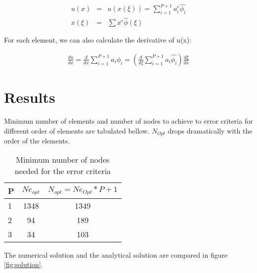 \documentclass[paper=a4, fontsize=11pt]{article} %
\begin{document}
\begin{eqnarray}
 u(x) &=& u(x(\xi))=\sum_{i=1}^{P+1} a_i^e \hat{\phi_i}\nonumber\\
 x(\xi) &=& \sum x^e \hat{\phi}(\xi)
 \end{eqnarray} 

For each element, we can also calculate the derivative of u(x):

\begin{eqnarray}
\frac{du}{dx} = \frac{d}{dx} \sum_{i=1}^{P+1} a_i \phi_i = (\frac{d}{d\xi}\sum_{i=1}^{P+1} a_i \hat{\phi_i})\frac{d\xi}{dx}
\end{eqnarray}


\section{Results}

Minimum number of elements and number of nodes to achieve to error criteria for different order of elements are tabulated bellow. $N_{Opt}$ drops dramatically with the order of the elements. 
\begin{table}
\begin{center}
  \begin{tabular}{ l | c | c}
    \hline
    P & $Ne_{opt}$ & $N_{opt} = Ne_{Opt} * P + 1 $\\ \hline
    1 & 1348 & 1349\\ \hline
    2 &  94 & 189\\ \hline
    3 & 34 & 103\\ \hline
    \hline
  \end{tabular}
  \caption{Minimum number of nodes needed for the error criteria}
\end{center}
\end{table}

The numerical solution and the analytical solution are compared in figure \ref{fig:solution}. 


        
\end{document}
